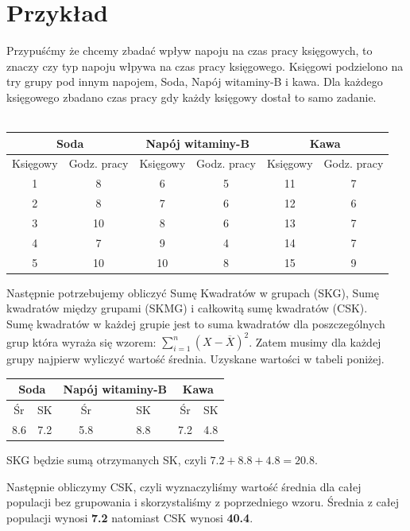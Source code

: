 \documentclass{article}
\begin{document}
{\section{Przykład}
Przypuśćmy że chcemy zbadać wpływ napoju na czas pracy księgowych, to znaczy czy typ napoju włpywa na czas pracy księgowego. Księgowi podzielono na try grupy pod innym napojem, Soda, Napój witaminy-B i kawa. Dla każdego księgowego zbadano czas pracy gdy każdy księgowy dostał to samo zadanie.\\
\\
\begin{tabular}{|c|c|c|c|c|c|}
\hline
\multicolumn{2}{|c|}{Soda} & \multicolumn{2}{|c|}{Napój witaminy-B} & \multicolumn{2}{|c|}{Kawa} \\
\hline
Księgowy & Godz. pracy & Księgowy & Godz. pracy & Księgowy & Godz. pracy\\
\hline
1 & 8 & 6 & 5 & 11 & 7 \\
\hline
2 & 8 & 7 & 6 & 12 & 6 \\
\hline
3 & 10 & 8 & 6 & 13 & 7 \\
\hline
4 & 7 & 9 & 4 & 14 & 7 \\
\hline
5 & 10 & 10 & 8 & 15 & 9 \\
\hline
\end{tabular}

Następnie potrzebujemy obliczyć Sumę Kwadratów w grupach (SKG), Sumę kwadratów między grupami (SKMG) i całkowitą sumę kwadratów (CSK).\\
Sumę kwadratów w każdej grupie jest to suma kwadratów dla poszczególnych grup która wyraża się wzorem: $\sum_{i=1}^n (X-\overline{X})^2$. Zatem musimy dla każdej grupy najpierw wyliczyć wartość średnia. Uzyskane wartości w tabeli poniżej. \\
\begin{center}
\begin{tabular}{|c|c|c|c|c|c|}
\hline
\multicolumn{2}{|c|}{Soda} & \multicolumn{2}{|c|}{Napój witaminy-B} & \multicolumn{2}{|c|}{Kawa} \\
\hline
Śr & SK & Śr & SK & Śr & SK \\
\hline
8.6 & 7.2 & 5.8 & 8.8 & 7.2 & 4.8\\
\hline
\end{tabular}
\end{center}
SKG będzie sumą otrzymanych SK, czyli $7.2 + 8.8 + 4.8 = 20.8$. \\ \par
Następnie obliczymy CSK, czyli wyznaczyliśmy wartość średnia dla całej populacji bez grupowania i skorzystaliśmy z poprzedniego wzoru. Średnia z całej populacji wynosi \textbf{7.2} natomiast CSK wynosi \textbf{40.4}. \\ \par

}
\end{document}
